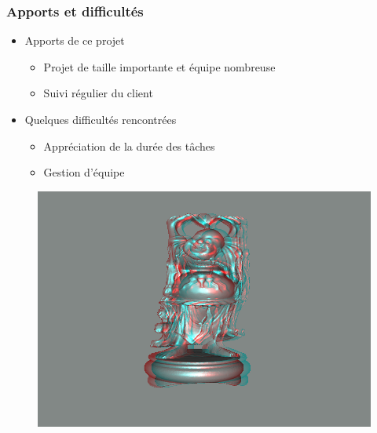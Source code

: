 \documentclass{beamer}
\begin{document}

\begin{frame}
\frametitle{Apports et difficultés}
\begin{itemize}[label=$\bullet$]
\item Apports de ce projet
	\begin{itemize}[label=$\circ$]
	\item Projet de taille importante et équipe nombreuse
	\item Suivi régulier du client
	\end{itemize}
\item Quelques difficultés rencontrées
	\begin{itemize}[label=$\circ$]
	\item Appréciation de la durée des tâches
	\item Gestion d'équipe
	\end{itemize}
\end{itemize}

\end{frame}

%
	
\begin{frame} 
\begin{figure}
\hspace*{-1cm}
\centering
\includegraphics[scale=0.6]{happy_dubois.png}
\end{figure}

\end{frame}

\end{document}
